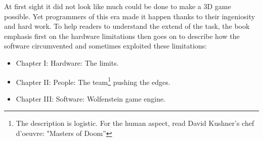 At first sight it did not look like much could be done to make a 3D game possible. Yet programmers of this era made it happen thanks to their ingeniosity and hard work. To help readers to understand the extend of the task, the book emphasis first on the hardware limitations then goes on to describe how the software circumvented and sometimes exploited these limitations:
\begin{itemize}
\item Chapter I: Hardware: The limits.
\item Chapter II: People: The team\footnote{The description is logistic. For the human aspect, read David Kushner's chef d'oeuvre: "Masters of Doom''} pushing the edges.
\item Chapter III: Software: Wolfenstein game engine.
\end{itemize}
